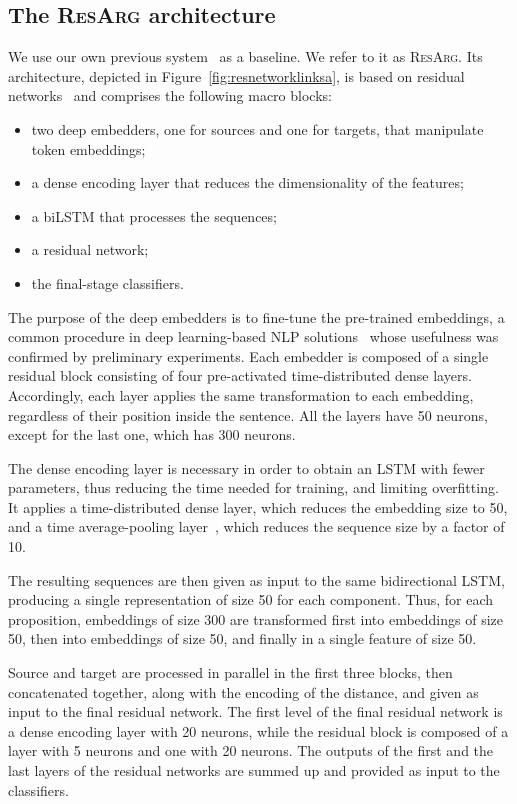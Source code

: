 \documentclass[journal]{IEEEtran}
\begin{document}
\subsection{The \textsc{ResArg} architecture}

We use our own previous system~\cite{W18-5201} as a baseline. We refer to it as \textsc{ResArg}. Its architecture, depicted in Figure~\ref{fig:resnetworklinksa}, is based on residual networks~\cite{He2016} and comprises the following macro blocks:

\begin{itemize}
\item two deep embedders, one for sources and one for targets,
that manipulate token embeddings;
\item a dense encoding layer that reduces the dimensionality of the features;
\item a biLSTM that processes the sequences;
\item a residual network;
\item the final-stage classifiers.
\end{itemize}
The purpose of the deep embedders is to fine-tune the pre-trained embeddings, a common procedure in deep learning-based NLP solutions~\cite{jurafsky} whose usefulness was confirmed by preliminary experiments.
Each embedder is composed of a single residual block consisting of four pre-activated time-distributed dense layers. Accordingly, each layer applies the same transformation to each embedding, regardless of their position inside the sentence.
All the layers have 50 neurons, except for the last one, which has 300 neurons.

The dense encoding layer is necessary in order to obtain an LSTM with fewer parameters, thus reducing the time needed for training, and limiting overfitting.
It applies a time-distributed dense layer, which reduces the embedding size to 50, and a time average-pooling layer~\cite{collobert2011natural}, which reduces the sequence size by a factor of 10.

The resulting sequences are then given as input to the same bidirectional LSTM, producing a single representation of size 50 for each component.
Thus, for each proposition,  embeddings of size 300 are transformed first into  embeddings of size 50, then into  embeddings of size 50, and finally in a single feature of size 50.

Source and target are processed in parallel in the first three blocks, then concatenated together, along with the encoding of the distance, and given as input to the final residual network.
The first level of the final residual network is a dense encoding layer with 20 neurons, while the residual block is composed of a layer with 5 neurons and one with 20 neurons. The outputs of the first and the last layers of the residual networks are summed up and provided as input to the classifiers.
\end{document}
